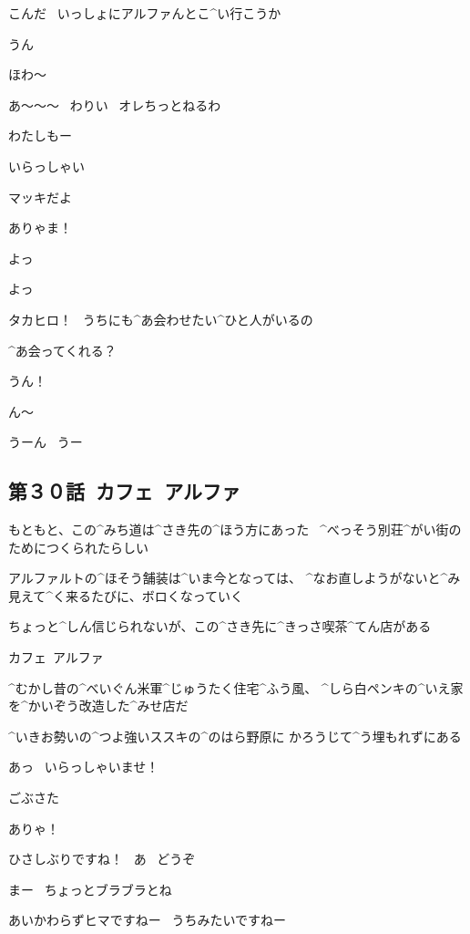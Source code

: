 \Takahiro こんだ
\ いっしょにアルファんとこ^{い}{行}こうか

\Makki うん

\page
\Takahiro ほわ〜

\Takahiro あ〜〜〜
\ わりい
\ オレちっとねるわ

\Makki わたしもー

\page
\Alpha いらっしゃい

\page
\Takahiro マッキだよ

\Alpha ありゃま！

\Alpha よっ

\Makki よっ

\Alpha タカヒロ！
\ うちにも^{あ}{会}わせたい^{ひと}{人}がいるの

\Alpha ^{あ}{会}ってくれる？

\Takahiro うん！

\page
\Takahiro ん〜

\Takahiro うーん
\ うー


\subsection{第３０話\ カフェ\ アルファ}

\page[94]
\Narrator もともと、この^{みち}{道}は^{さき}{先}の^{ほう}{方}にあった
\ ^{べっそう}{別荘}^{がい}{街}のためにつくられたらしい

\page
\Narrator アルファルトの^{ほそう}{舗装}は^{いま}{今}となっては、
^{なお}{直}しようがないと^{み}{見}えて^{く}{来}るたびに、ボロくなっていく

\page
\Narrator ちょっと^{しん}{信}じられないが、この^{さき}{先}に^{きっさ}{喫茶}^{てん}{店}がある

\Narrator カフェ\ アルファ

\Narrator ^{むかし}{昔}の^{べいぐん}{米軍}^{じゅうたく}{住宅}^{ふう}{風}、
^{しら}{白}ペンキの^{いえ}{家}を^{かいぞう}{改造}した^{みせ}{店}だ

\page
\Narrator ^{いきお}{勢}いの^{つよ}{強}いススキの^{のはら}{野原}に
かろうじて^{う}{埋}もれずにある

\page
\Alpha あっ
\ いらっしゃいませ！

\Narrator ごぶさた

\page
\Alpha ありゃ！

\Alpha ひさしぶりですね！
\ あ
\ どうぞ

\Narrator まー
\ ちょっとブラブラとね

\Alpha あいかわらずヒマですねー
\ うちみたいですねー

